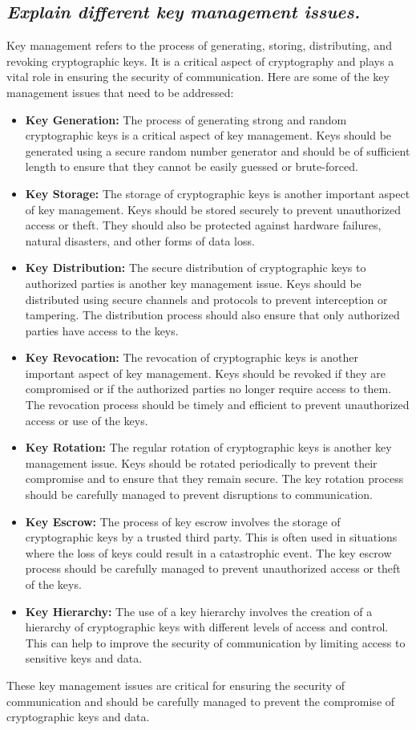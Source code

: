 \documentclass{article}
\begin{document}
\subsection{\textit{Explain different key management issues.}}
Key management refers to the process of generating, storing, distributing, and revoking cryptographic keys. It is a critical aspect of cryptography and plays a vital role in ensuring the security of communication. Here are some of the key management issues that need to be addressed:
\begin{itemize}
    \item \textbf{Key Generation:} The process of generating strong and random cryptographic keys is a critical aspect of key management. Keys should be generated using a secure random number generator and should be of sufficient length to ensure that they cannot be easily guessed or brute-forced.
    \item \textbf{Key Storage:} The storage of cryptographic keys is another important aspect of key management. Keys should be stored securely to prevent unauthorized access or theft. They should also be protected against hardware failures, natural disasters, and other forms of data loss.
    \item \textbf{Key Distribution:} The secure distribution of cryptographic keys to authorized parties is another key management issue. Keys should be distributed using secure channels and protocols to prevent interception or tampering. The distribution process should also ensure that only authorized parties have access to the keys.
    \item \textbf{Key Revocation:} The revocation of cryptographic keys is another important aspect of key management. Keys should be revoked if they are compromised or if the authorized parties no longer require access to them. The revocation process should be timely and efficient to prevent unauthorized access or use of the keys.
    \item \textbf{Key Rotation:} The regular rotation of cryptographic keys is another key management issue. Keys should be rotated periodically to prevent their compromise and to ensure that they remain secure. The key rotation process should be carefully managed to prevent disruptions to communication.
    \item \textbf{Key Escrow:} The process of key escrow involves the storage of cryptographic keys by a trusted third party. This is often used in situations where the loss of keys could result in a catastrophic event. The key escrow process should be carefully managed to prevent unauthorized access or theft of the keys.
    \item \textbf{Key Hierarchy:} The use of a key hierarchy involves the creation of a hierarchy of cryptographic keys with different levels of access and control. This can help to improve the security of communication by limiting access to sensitive keys and data.
\end{itemize}
These key management issues are critical for ensuring the security of communication and should be carefully managed to prevent the compromise of cryptographic keys and data.
\end{document}
